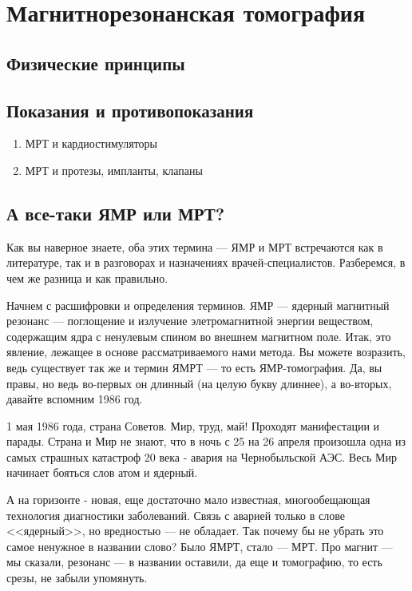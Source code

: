 \section{Магнитнорезонанская томография}

\subsection{Физические принципы}

\subsection{Показания и противопоказания}

\begin{enumerate}
\item МРТ и кардиостимуляторы
\item МРТ и протезы, импланты, клапаны
\end{enumerate}


\subsection{А все-таки ЯМР или МРТ?}
Как вы наверное знаете, оба этих термина --- ЯМР и МРТ встречаются как в литературе, так и в разговорах и назначениях врачей-специалистов. Разберемся, в чем же разница и как правильно.

Начнем с расшифровки и определения терминов. ЯМР --- ядерный магнитный резонанс --- поглощение и излучение элетромагнитной энергии веществом, содержащим ядра с ненулевым спином во внешнем магнитном поле. Итак, это явление, лежащее в основе рассматриваемого нами метода. Вы можете возразить, ведь существует так же и термин ЯМРТ --- то есть ЯМР-томография. Да, вы правы, но ведь во-первых он длинный (на целую букву длиннее), а во-вторых, давайте вспомним 1986 год.

1 мая 1986 года, страна Советов. Мир, труд, май! Проходят манифестации и парады. Страна и Мир не знают, что в ночь с 25 на 26 апреля произошла одна из самых страшных катастроф 20 века - авария на Чернобыльской АЭС. Весь Мир начинает бояться слов атом и ядерный. 

А на горизонте - новая, еще достаточно мало известная, многообещающая технология диагностики заболеваний. Связь с аварией только в слове <<ядерный>>, но вредностью --- не обладает. Так почему бы не убрать это самое ненужное в названии слово? Было ЯМРТ, стало --- МРТ. Про магнит --- мы сказали, резонанс --- в названии оставили, да еще и томографию, то есть срезы, не забыли упомянуть. 

